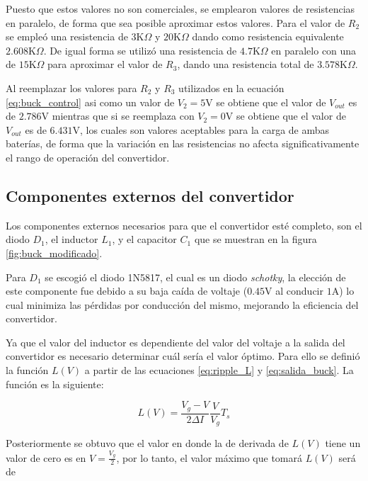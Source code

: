 Puesto que estos valores no son comerciales, se emplearon valores de resistencias en 
paralelo, de forma que sea posible aproximar estos valores. Para el valor de $R_2$ 
se empleó una resistencia de $3\text{K}\Omega$ y $20\text{K}\Omega$ dando como 
resistencia equivalente $2.608\text{K}\Omega$. De igual forma se utilizó una 
resistencia de $4.7\text{K}\Omega$ en paralelo con una de $15\text{K}\Omega$ para aproximar
 el valor de $R_3$, dando una resistencia total de $3.578\text{K}\Omega$.

Al reemplazar los valores para $R_2$ y $R_3$ utilizados en la ecuación \ref{eq:buck_control}
asi como un valor de $V_2 = 5\text{V}$ se obtiene que el valor de $V_{out}$ es de $2.786\text{V}$
mientras que si se reemplaza con $V_2 = 0\text{V}$ se obtiene que el valor de $V_{out}$ es de
$6.431\text{V}$, los cuales son valores aceptables para la carga de ambas baterías,
de forma que la variación en las resistencias no afecta significativamente
el rango de operación del convertidor.

\subsection{Componentes externos del convertidor}

Los componentes externos necesarios para que el convertidor esté completo, son el 
diodo $D_1$, el inductor $L_1$, y el capacitor $C_1$ que se muestran en la figura
\ref{fig:buck_modificado}.

 Para $D_1$ se escogió el diodo 1N5817, el cual es un diodo \textit{
 schotky}, la elección de este componente fue debido a su baja caída de voltaje
  ($0.45\text{V}$ al conducir $1\text{A}$) lo cual minimiza las pérdidas por 
  conducción del mismo, mejorando la eficiencia del convertidor.

Ya que el valor del inductor es dependiente
del valor del voltaje a la salida del convertidor es necesario determinar cuál
sería el valor óptimo. Para ello se definió la función $L(V)$ a partir de las 
ecuaciones \ref{eq:ripple_L} y \ref{eq:salida_buck}. La función es la siguiente: 

\begin{equation}
    L(V) = \frac{V_g - V}{2\Delta I}\frac{V}{V_g} T_s
    \label{eq:L_function}
\end{equation}

Posteriormente se obtuvo que el valor en
donde la de derivada de $L(V)$ tiene un valor de cero es en $V = \frac{V_g}{2}$,
por lo tanto, el valor máximo que tomará $L(V)$ será de 

